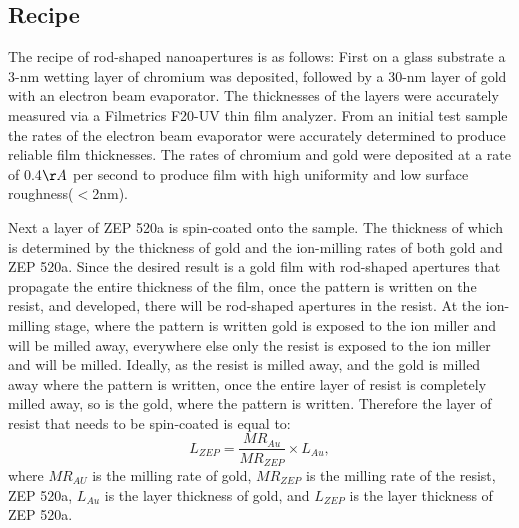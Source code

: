 \subsection{Recipe}
The recipe of rod-shaped nanoapertures is as follows:
First on a glass substrate a 3-nm wetting layer of chromium was deposited, followed by a 30-nm layer of gold with an electron beam evaporator. The thicknesses of the layers were accurately measured via a Filmetrics F20-UV thin film analyzer. From an initial test sample the rates of the electron beam evaporator were accurately determined to produce reliable film thicknesses. The rates of chromium and gold were deposited at a rate of 0.4$\AA$ per second to produce film with high uniformity and low surface roughness($<$2nm).

Next a layer of ZEP 520a is spin-coated onto the sample. The thickness of which is determined by the thickness of gold and the ion-milling rates of both gold and ZEP 520a. Since the desired result is a gold film with rod-shaped apertures that propagate the entire thickness of the film, once the pattern is written on the resist, and developed, there will be rod-shaped apertures in the resist. At the ion-milling stage, where the pattern is written gold is exposed to the ion miller and will be milled away, everywhere else only the resist is exposed to the ion miller and will be milled. Ideally, as the resist is milled away, and the gold is milled away where the pattern is written, once the entire layer of resist is completely milled away, so is the gold, where the pattern is written. Therefore the layer of resist that needs to be spin-coated is equal to:
\begin{equation}
L_{ZEP} = \frac{MR_{Au}}{MR_{ZEP}}\times L_{Au},
\end{equation}
where $MR_{AU}$ is the milling rate of gold, $MR_{ZEP}$ is the milling rate of the resist, ZEP 520a, $L_{Au}$ is the layer thickness of gold, and $L_{ZEP}$ is the layer thickness of ZEP 520a.


